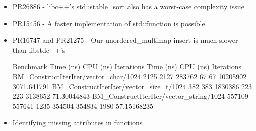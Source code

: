 \documentclass{beamer}
\begin{document}
{\begin{itemize}
  \item PR26886 - libc++'s std::stable\_sort also has a worst-case complexity issue

  \item PR15456 - A faster implementation of std::function is possible

  \item PR16747 and PR21275 - Our unordered\_multimap insert is much slower than libstdc++'s




Benchmark	                                Time (ns)	CPU (ns)	Iterations	Time (ns)	CPU (ns)	Iterations	%
BM_ConstructIterIter/vector_char/1024	2125	2127	283762	67	67	10205902	3071.641791
BM_ConstructIterIter/vector_size_t/1024	382	383	1830386	223	223	3138652	71.30044843
BM_ConstructIterIter/vector_string/1024	557109	557641	1235	354504	354834	1980	57.15168235

  \item Identifying missing attributes in functions 

  \end{itemize}
}
\end{document}
